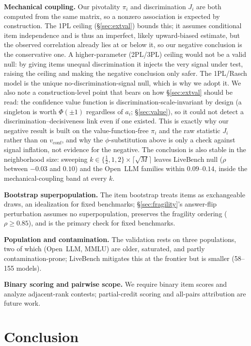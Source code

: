 \documentclass[conference]{IEEEtran}
\begin{document}
\textbf{Mechanical coupling.}
Our pivotality $\pi_i$ and discrimination $J_i$ are both computed from the same matrix, so a nonzero association is expected by construction.
The 1PL ceiling (\S\ref{sec:extval}) bounds this; it assumes conditional item independence and is thus an imperfect, likely upward-biased estimate, but the observed correlation already lies at or below it, so our negative conclusion is the conservative one.
A higher-parameter (2PL/3PL) ceiling would not be a valid null: by giving items unequal discrimination it injects the very signal under test, raising the ceiling and making the negative conclusion only safer.
The 1PL/Rasch model is the unique no-discrimination-signal null, which is why we adopt it.
We also note a construction-level point that bears on how \S\ref{sec:extval} should be read: the confidence value function is discrimination-scale-invariant by design (a singleton is worth $\Phi(\pm1)$ regardless of $a_i$; \S\ref{sec:value}), so it could not detect a discrimination--decisiveness link even if one existed.
This is exactly why our negative result is built on the value-function-free $\pi_i$ and the raw statistic $J_i$ rather than on $v_{\text{conf}}$, and why the $\phi$-substitution above is only a check against signal inflation, not evidence for the negative.
The conclusion is also stable in the neighborhood size: sweeping $k\in\{\tfrac12,1,2\}\times\lceil\sqrt{M}\rceil$ leaves LiveBench null ($\rho$ between $-0.03$ and $0.10$) and the Open~LLM families within $0.09$--$0.14$, inside the mechanical-coupling band at every $k$.

\textbf{Bootstrap superpopulation.}
The item bootstrap treats items as exchangeable draws, an idealization for fixed benchmarks; \S\ref{sec:fragility}'s answer-flip perturbation assumes no superpopulation, preserves the fragility ordering ($\rho\geq0.85$), and is the primary check for fixed benchmarks.

\textbf{Population and contamination.}
The validation rests on three populations, two of which (Open~LLM, MMLU) are older, saturated, and partly contamination-prone; LiveBench mitigates this at the frontier but is smaller (58--155 models).

\textbf{Binary scoring and pairwise scope.}
We require binary item scores and analyze adjacent-rank contests; partial-credit scoring and all-pairs attribution are future work.

\section{Conclusion}
\label{sec:conclusion}
\end{document}

